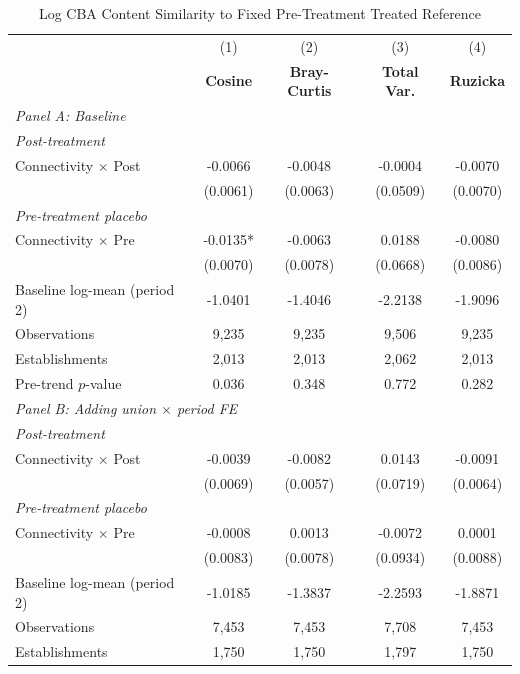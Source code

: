 \begin{table}[H]
\centering
\caption{Log CBA Content Similarity to Fixed Pre-Treatment Treated Reference}
\label{tab:pretreat_ref_ln_cba_similarity}
\scriptsize
\setlength{\tabcolsep}{8pt}
\begin{tabular}{lcccc}
\hline\hline
 & (1) & (2) & (3) & (4) \\
 & \textbf{Cosine} & \textbf{Bray-Curtis} & \textbf{Total Var.} & \textbf{Ruzicka} \\
\hline
\multicolumn{5}{l}{\textit{Panel A: Baseline}} \\
\multicolumn{5}{l}{\textit{Post-treatment}} \\
Connectivity $\times$ Post & -0.0066 & -0.0048 & -0.0004 & -0.0070 \\
 & (0.0061) & (0.0063) & (0.0509) & (0.0070) \\
\multicolumn{5}{l}{\textit{Pre-treatment placebo}} \\
Connectivity $\times$ Pre & -0.0135* & -0.0063 & 0.0188 & -0.0080 \\
 & (0.0070) & (0.0078) & (0.0668) & (0.0086) \\
\hline
Baseline log-mean (period 2) & -1.0401 & -1.4046 & -2.2138 & -1.9096 \\
Observations &        9,235 &        9,235 &        9,506 &        9,235 \\
Establishments &        2,013 &        2,013 &        2,062 &        2,013 \\
Pre-trend $p$-value & 0.036 & 0.348 & 0.772 & 0.282 \\
\hline
\multicolumn{5}{l}{\textit{Panel B: Adding union $\times$ period FE}} \\
\multicolumn{5}{l}{\textit{Post-treatment}} \\
Connectivity $\times$ Post & -0.0039 & -0.0082 & 0.0143 & -0.0091 \\
 & (0.0069) & (0.0057) & (0.0719) & (0.0064) \\
\multicolumn{5}{l}{\textit{Pre-treatment placebo}} \\
Connectivity $\times$ Pre & -0.0008 & 0.0013 & -0.0072 & 0.0001 \\
 & (0.0083) & (0.0078) & (0.0934) & (0.0088) \\
\hline
Baseline log-mean (period 2) & -1.0185 & -1.3837 & -2.2593 & -1.8871 \\
Observations &        7,453 &        7,453 &        7,708 &        7,453 \\
Establishments &        1,750 &        1,750 &        1,797 &        1,750 \\

\end{tabular}
\end{table}
